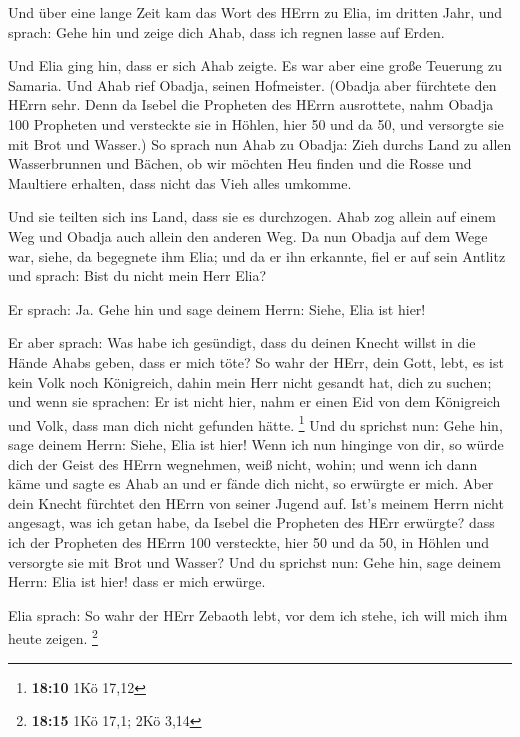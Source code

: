 Und über eine lange Zeit kam das Wort des HErrn zu Elia,
im dritten Jahr, und sprach: Gehe hin und zeige dich Ahab, dass ich
regnen lasse auf Erden.

 Und Elia ging hin, dass er sich Ahab zeigte. Es war aber
eine große Teuerung zu Samaria.  Und Ahab rief Obadja,
seinen Hofmeister. (Obadja aber fürchtete den HErrn sehr. 
Denn da Isebel die Propheten des HErrn ausrottete, nahm Obadja 100
Propheten und versteckte sie in Höhlen, hier 50 und da 50, und versorgte
sie mit Brot und Wasser.)  So sprach nun Ahab zu Obadja:
Zieh durchs Land zu allen Wasserbrunnen und Bächen, ob wir möchten Heu
finden und die Rosse und Maultiere erhalten, dass nicht das Vieh alles
umkomme.

 Und sie teilten sich ins Land, dass sie es durchzogen.
Ahab zog allein auf einem Weg und Obadja auch allein den anderen Weg.
 Da nun Obadja auf dem Wege war, siehe, da begegnete ihm
Elia; und da er ihn erkannte, fiel er auf sein Antlitz und sprach: Bist
du nicht mein Herr Elia?

 Er sprach: Ja. Gehe hin und sage deinem Herrn: Siehe,
Elia ist hier!

 Er aber sprach: Was habe ich gesündigt, dass du deinen
Knecht willst in die Hände Ahabs geben, dass er mich töte?
 So wahr der HErr, dein Gott, lebt, es ist kein Volk noch
Königreich, dahin mein Herr nicht gesandt hat, dich zu suchen; und wenn
sie sprachen: Er ist nicht hier, nahm er einen Eid von dem Königreich
und Volk, dass man dich nicht gefunden hätte. \footnote{\textbf{18:10}
  1Kö 17,12}  Und du sprichst nun: Gehe hin, sage deinem
Herrn: Siehe, Elia ist hier!  Wenn ich nun hinginge von
dir, so würde dich der Geist des HErrn wegnehmen, weiß nicht, wohin; und
wenn ich dann käme und sagte es Ahab an und er fände dich nicht, so
erwürgte er mich. Aber dein Knecht fürchtet den HErrn von seiner Jugend
auf.  Ist's meinem Herrn nicht angesagt, was ich getan
habe, da Isebel die Propheten des HErr erwürgte? dass ich der Propheten
des HErrn 100 versteckte, hier 50 und da 50, in Höhlen und versorgte sie
mit Brot und Wasser?  Und du sprichst nun: Gehe hin, sage
deinem Herrn: Elia ist hier! dass er mich erwürge.

 Elia sprach: So wahr der HErr Zebaoth lebt, vor dem ich
stehe, ich will mich ihm heute zeigen. \footnote{\textbf{18:15} 1Kö
  17,1; 2Kö 3,14}


